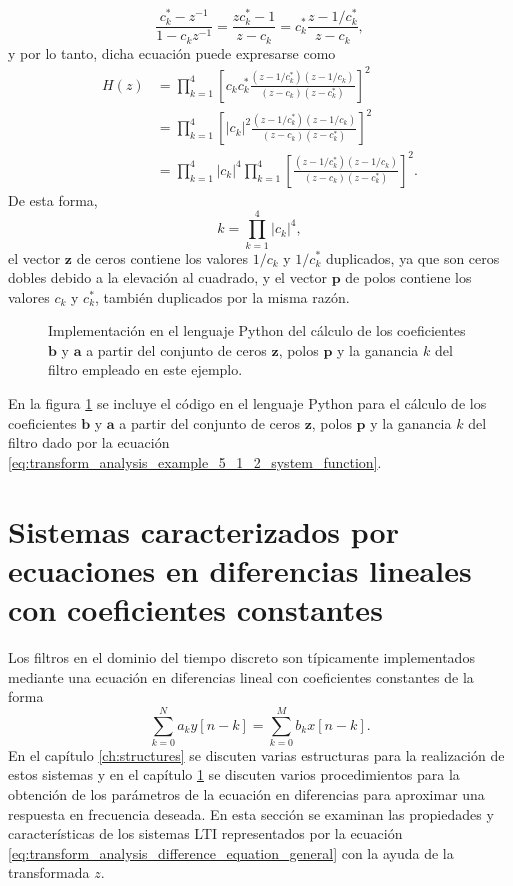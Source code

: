 \documentclass[a4paper]{report}
\newcommand{\z}{\mathbf{z}}
\begin{document}
\[
 \frac{c^*_k-z^{-1}}{1-c_kz^{-1}}=\frac{zc^*_k-1}{z-c_k}=c^*_k\frac{z-1/c^*_k}{z-c_k},
\]
y por lo tanto, dicha ecuación puede expresarse como
\begin{align*}
 H(z)&=\prod_{k=1}^4\left[c_kc^*_k\frac{(z-1/c^*_k)(z-1/c_k)}{(z-c_k)(z-c^*_k)}\right]^2\\
  &=\prod_{k=1}^4\left[|c_k|^2\frac{(z-1/c^*_k)(z-1/c_k)}{(z-c_k)(z-c^*_k)}\right]^2\\
  &=\prod_{k=1}^4|c_k|^4\prod_{k=1}^4\left[\frac{(z-1/c^*_k)(z-1/c_k)}{(z-c_k)(z-c^*_k)}\right]^2. 
\end{align*}
De esta forma,
\[
 k=\prod_{k=1}^4|c_k|^4,
\]
el vector \(\z\) de ceros contiene los valores \(1/c_k\) y \(1/c^*_k\) duplicados, ya que son ceros dobles debido a la elevación al cuadrado, y el vector \(\mathbf{p}\) de polos contiene los valores \(c_k\) y \(c^*_k\), también duplicados por la misma razón.
\begin{figure}
\begin{center}

\caption{\label{fig:transform_analysis_filter_ba_coefs_from_zpk} Implementación en el lenguaje Python del cálculo de los coeficientes \(\mathbf{b}\) y \(\mathbf{a}\) a partir del conjunto de ceros \(\z\), polos \(\mathbf{p}\) y la ganancia \(k\) del filtro empleado en este ejemplo.}
\end{center}
\end{figure}
En la figura \ref{fig:transform_analysis_filter_ba_coefs_from_zpk} se incluye el código en el lenguaje Python para el cálculo de los coeficientes \(\mathbf{b}\) y \(\mathbf{a}\) a partir del conjunto de ceros \(\z\), polos \(\mathbf{p}\) y la ganancia \(k\) del filtro dado por la ecuación \ref{eq:transform_analysis_example_5_1_2_system_function}.

\section{Sistemas caracterizados por ecuaciones en diferencias lineales con coeficientes constantes}

Los filtros en el dominio del tiempo discreto son típicamente implementados mediante una ecuación en diferencias lineal con coeficientes constantes de la forma
\begin{equation}\label{eq:transform_analysis_difference_equation_general}
 \sum_{k=0}^Na_ky[n-k]=\sum_{k=0}^Mb_kx[n-k]. 
\end{equation}
En el capítulo \ref{ch:structures} se discuten varias estructuras para la realización de estos sistemas y en el capítulo \ref{} se discuten varios procedimientos para la obtención de los parámetros de la ecuación en diferencias para aproximar una respuesta en frecuencia deseada. En esta sección se examinan las propiedades y características de los sistemas LTI representados por la ecuación \ref{eq:transform_analysis_difference_equation_general} con la ayuda de la transformada \(z\).
\end{document}
